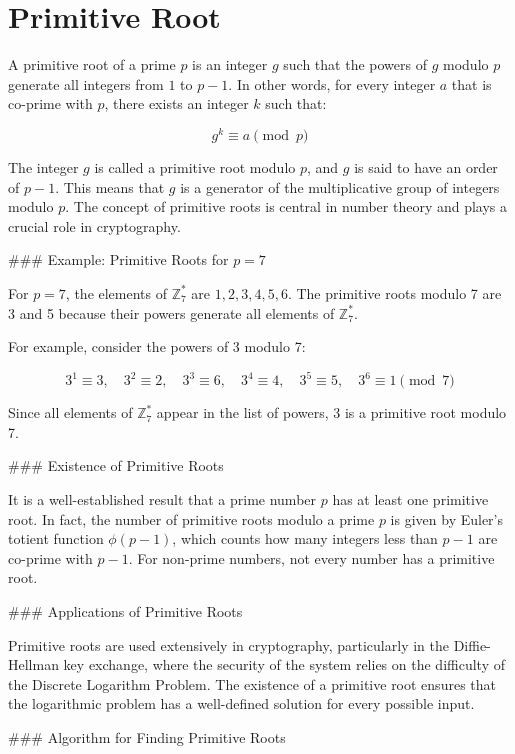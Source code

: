 \documentclass[10pt,a4paper]{article}
\begin{document}
\section*{Primitive Root}

A primitive root of a prime \(p\) is an integer \(g\) such that the powers of \(g\) modulo \(p\) generate all integers from \(1\) to \(p-1\). In other words, for every integer \(a\) that is co-prime with \(p\), there exists an integer \(k\) such that:

\[
g^k \equiv a \pmod{p}
\]

The integer \(g\) is called a primitive root modulo \(p\), and \(g\) is said to have an order of \(p-1\). This means that \(g\) is a generator of the multiplicative group of integers modulo \(p\). The concept of primitive roots is central in number theory and plays a crucial role in cryptography.

### Example: Primitive Roots for \(p = 7\)

For \(p = 7\), the elements of \( \mathbb{Z}_7^* \) are \(1, 2, 3, 4, 5, 6\). The primitive roots modulo 7 are 3 and 5 because their powers generate all elements of \( \mathbb{Z}_7^* \).

For example, consider the powers of 3 modulo 7:

\[
3^1 \equiv 3, \quad 3^2 \equiv 2, \quad 3^3 \equiv 6, \quad 3^4 \equiv 4, \quad 3^5 \equiv 5, \quad 3^6 \equiv 1 \pmod{7}
\]

Since all elements of \( \mathbb{Z}_7^* \) appear in the list of powers, 3 is a primitive root modulo 7.

### Existence of Primitive Roots

It is a well-established result that a prime number \(p\) has at least one primitive root. In fact, the number of primitive roots modulo a prime \(p\) is given by Euler's totient function \(\phi(p-1)\), which counts how many integers less than \(p-1\) are co-prime with \(p-1\). For non-prime numbers, not every number has a primitive root.

### Applications of Primitive Roots

Primitive roots are used extensively in cryptography, particularly in the Diffie-Hellman key exchange, where the security of the system relies on the difficulty of the Discrete Logarithm Problem. The existence of a primitive root ensures that the logarithmic problem has a well-defined solution for every possible input.

### Algorithm for Finding Primitive Roots
\end{document}
